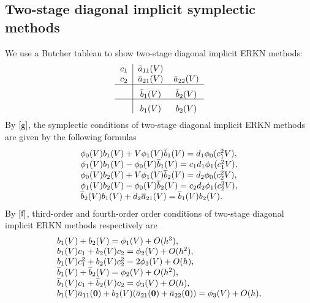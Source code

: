 \documentclass{article}
\begin{document}
\subsection{Two-stage diagonal implicit  symplectic methods}\label{112233}
We  use a  Butcher  tableau to show two-stage diagonal implicit ERKN
methods:
\[%
\begin{tabular}
[c]{c|ccc}%
$c_{1}$ & $\bar{a}_{11}(V)$ \\
$c_{2}$ & $\bar{a}_{21}(V)$ & $\bar{a}_{22}(V)$\\\hline &
$\raisebox{-1.3ex}[0.5pt]{$\bar{b}_1(V)$}$ &
$\raisebox{-1.3ex}[0.5pt]{$\bar{b}_2(V)$}$\\\hline &
$\raisebox{-1.3ex}[1.0pt]{$b_1(V)$}$ &
$\raisebox{-1.3ex}[1.0pt]{$b_2(V)$}$%
\end{tabular}
\]
By $\eqref{g}$, the symplectic conditions of two-stage diagonal
implicit ERKN methods are given by the following formulas
\begin{equation}
\begin{array}
[c]{ll}
\phi_{0}(V)b_{1}(V)+V\phi_{1}(V)\overline{b}_{1}(V)=d_{1}\phi_{0}(c_{1}^{2}V),\\
\phi_{1}(V)b_{1}(V)-\phi_{0}(V)\overline{b}_{1}(V)=c_{1}d_{1}\phi_{1}(c_{1}^{2}V),\\
\phi_{0}(V)b_{2}(V)+V\phi_{1}(V)\overline{b}_{2}(V)=d_{2}\phi_{0}(c_{2}^{2}V),\\
\phi_{1}(V)b_{2}(V)-\phi_{0}(V)\overline{b}_{2}(V)=c_{2}d_{2}\phi_{1}(c_{2}^{2}V),\\
\overline{b}_{2}(V)b_{1}(V)+d_{2}\overline{a}_{21}(V)=\overline{b}_{1}(V)b_{2}(V).
\end{array}
  \label{q}%
\end{equation}
By $\eqref{f}$, third-order and fourth-order order conditions of
two-stage diagonal implicit ERKN methods respectively are
 \begin{equation}
\begin{array}
[c]{ll} b_{1}(V)+b_{2}(V)=\phi_{1}(V)+O(h^{3}),
\\b_{1}(V)c_{1}+b_{2}(V)c_{2}=\phi_{2}(V)+O(h^{2}),
\\b_{1}(V)c_{1}^{2}+b_{2}(V)c_{2}^{2}=2\phi_{3}(V)+O(h),
\\\overline{b}_{1}(V)+\overline{b}_{2}(V)=\phi_{2}(V)+O(h^{2}),
\\\overline{b}_{1}(V)c_{1}+\overline{b}_{2}(V)c_{2}=\phi_{3}(V)+O(h),
\\b_{1}(V)\overline{a}_{11}(\textbf{0})+b_{2}(V)(\overline{a}_{21}(\textbf{0})+\overline{a}_{22}(\textbf{0}))=\phi_{3}(V)+O(h),
\end{array}
  \label{r}%
\end{equation}
\end{document}
